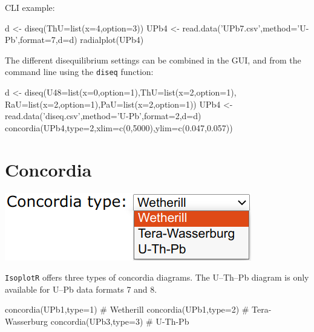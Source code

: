 \begin{refsection}
\begin{enumerate}
\begin{enumerate}
\noindent CLI example:
\begin{script}
d <- diseq(ThU=list(x=4,option=3))
UPb4 <- read.data('UPb7.csv',method='U-Pb',format=7,d=d)
radialplot(UPb4)
\end{script}

\end{enumerate}

The different disequilibrium settings can be combined in the GUI, and
from the command line using the \texttt{diseq} function:

\begin{script}
d <- diseq(U48=list(x=0,option=1),ThU=list(x=2,option=1),
           RaU=list(x=2,option=1),PaU=list(x=2,option=1))
UPb4 <- read.data('diseq.csv',method='U-Pb',format=2,d=d)
concordia(UPb4,type=2,xlim=c(0,5000),ylim=c(0.047,0.057))
\end{script}

\end{enumerate}

\section{Concordia} \label{sec:concordia-R}

\noindent\begin{minipage}[t]{.3\linewidth}
  \strut\vspace*{-\baselineskip}\newline
  \includegraphics[width=\linewidth]{../figures/ConcordiaMenu.png}
\end{minipage}
\begin{minipage}[t]{.7\linewidth}
  \texttt{IsoplotR} offers three types of concordia diagrams. The
  U--Th--Pb diagram is only available for U--Pb data formats 7 and 8.
\end{minipage}

\begin{script}
concordia(UPb1,type=1) # Wetherill
concordia(UPb1,type=2) # Tera-Wasserburg
concordia(UPb3,type=3) # U-Th-Pb
\end{script}

\begin{enumerate}


\end{enumerate}
\end{refsection}
